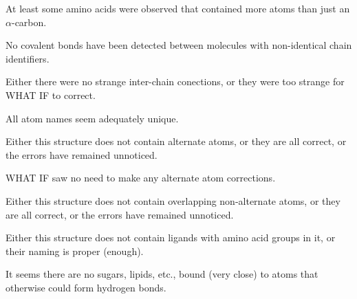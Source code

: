 \begin{note}
At least some amino acids were observed that contained more atoms
than just an $\alpha$-carbon.
\end{note}

\begin{note}
No covalent bonds have been detected between molecules with
non-identical chain identifiers.
\end{note}

\begin{note}
Either there were no strange inter-chain conections, or they were too
strange for WHAT IF to correct.
\end{note}

\begin{note}
All atom names seem adequately unique.
\end{note}

\begin{note}
Either this structure does not contain alternate atoms, or they are all
correct, or the errors have remained unnoticed.
\end{note}

\begin{note}
WHAT IF saw no need to make any alternate atom corrections.
\end{note}

\begin{note}
Either this structure does not contain overlapping non-alternate atoms,
or they are all correct, or the errors have remained unnoticed.
\end{note}

\begin{note}
Either this structure does not contain ligands with amino acid groups
in it, or their naming is proper (enough).
\end{note}

\begin{note}
It seems there are no sugars, lipids, etc., bound (very close) to
atoms that otherwise could form hydrogen bonds.
\end{note}

